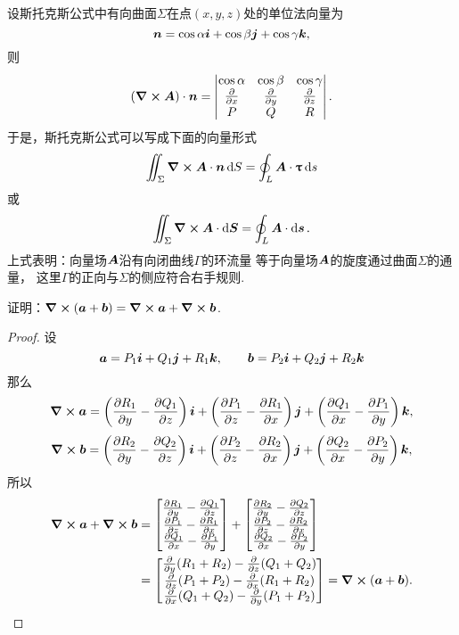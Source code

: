 设斯托克斯公式中有向曲面\(\Sigma\)在点\((x,y,z)\)处的单位法向量为\[
	\boldsymbol{n} = \cos\alpha \boldsymbol{i} + \cos\beta \boldsymbol{j} + \cos\gamma \boldsymbol{k},
\]
则\[
	(\curl{\boldsymbol{A}}) \cdot \boldsymbol{n} = \begin{vmatrix}
		\cos\alpha & \cos\beta & \cos\gamma \\
		\pdv{x} & \pdv{y} & \pdv{z} \\
		P & Q & R \\
	\end{vmatrix}.
\]
于是，斯托克斯公式可以写成下面的向量形式\[
	\iint_\Sigma \curl{\boldsymbol{A}} \cdot \boldsymbol{n} \dd{S}
	= \oint_L \boldsymbol{A} \cdot \boldsymbol{\uptau} \dd{s}
\]或\[
	\iint_\Sigma \curl{\boldsymbol{A}} \cdot \dd{\boldsymbol{S}}
	= \oint_L \boldsymbol{A} \cdot \dd{\boldsymbol{s}}.
\]
上式表明：向量场\(\boldsymbol{A}\)沿有向闭曲线\(\Gamma\)的环流量
等于向量场\(\boldsymbol{A}\)的旋度通过曲面\(\Sigma\)的通量，
这里\(\Gamma\)的正向与\(\Sigma\)的侧应符合右手规则.

\begin{example}
证明：\(\curl(\boldsymbol{a}+\boldsymbol{b}) = \curl\boldsymbol{a} + \curl\boldsymbol{b}\).
\begin{proof}
设\[
	\boldsymbol{a}=P_1\boldsymbol{i}+Q_1\boldsymbol{j}+R_1\boldsymbol{k}, \qquad
	\boldsymbol{b}=P_2\boldsymbol{i}+Q_2\boldsymbol{j}+R_2\boldsymbol{k}
\]
那么\[
	\curl{\boldsymbol{a}}
	=\left( \pdv{R_1}{y} - \pdv{Q_1}{z} \right)\boldsymbol{i}
	+\left( \pdv{P_1}{z} - \pdv{R_1}{x} \right)\boldsymbol{j}
	+\left( \pdv{Q_1}{x} - \pdv{P_1}{y} \right)\boldsymbol{k},
\]\[
	\curl{\boldsymbol{b}}
	=\left( \pdv{R_2}{y} - \pdv{Q_2}{z} \right)\boldsymbol{i}
	+\left( \pdv{P_2}{z} - \pdv{R_2}{x} \right)\boldsymbol{j}
	+\left( \pdv{Q_2}{x} - \pdv{P_2}{y} \right)\boldsymbol{k},
\]
所以{\def\arraystretch{1.5}
\begin{align*}
	\curl{\boldsymbol{a}} + \curl{\boldsymbol{b}}
	&= \begin{bmatrix}
		\pdv{R_1}{y} - \pdv{Q_1}{z} \\
		\pdv{P_1}{z} - \pdv{R_1}{x} \\
		\pdv{Q_1}{x} - \pdv{P_1}{y}
	\end{bmatrix}
	+ \begin{bmatrix}
		\pdv{R_2}{y} - \pdv{Q_2}{z} \\
		\pdv{P_2}{z} - \pdv{R_2}{x} \\
		\pdv{Q_2}{x} - \pdv{P_2}{y}
	\end{bmatrix} \\
	&= \begin{bmatrix}
		\pdv{y}(R_1+R_2) - \pdv{z}(Q_1+Q_2) \\
		\pdv{z}(P_1+P_2) - \pdv{x}(R_1+R_2) \\
		\pdv{x}(Q_1+Q_2) - \pdv{y}(P_1+P_2)
	\end{bmatrix}
	= \curl(\boldsymbol{a}+\boldsymbol{b}).
	\qedhere
\end{align*}}
\end{proof}
\end{example}

